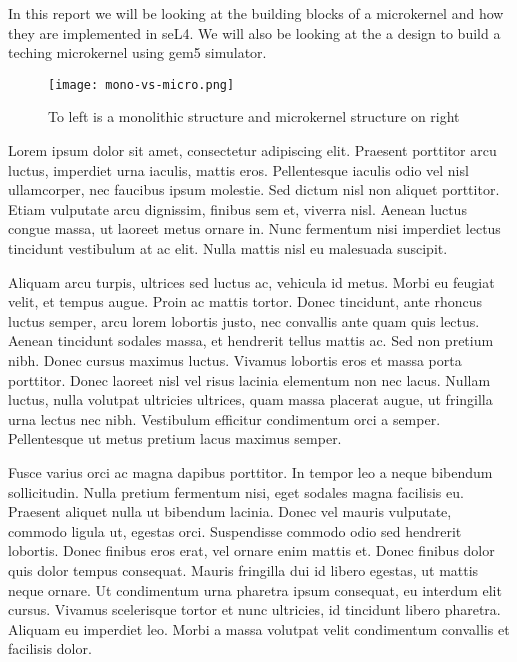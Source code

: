 \documentclass[
	a4paper, %
	10pt, %
	unnumberedsections, %
	twoside, %
]{LTJournalArticle}
\begin{document}
In this report we will be looking at the building blocks of a microkernel and how they are implemented in seL4. We will also be looking at the a design to build a teching microkernel using gem5 simulator.\cite{gem5}


\begin{figure*} %
	\texttt{[image: mono-vs-micro.png]}
	\caption{To left is a monolithic structure and microkernel structure on right~\cite{Heiser:2020}}
	\label{fig:microsemantic}
\end{figure*}

\newpage

Lorem ipsum dolor sit amet, consectetur adipiscing elit. Praesent porttitor arcu luctus, imperdiet urna iaculis, mattis eros. Pellentesque iaculis odio vel nisl ullamcorper, nec faucibus ipsum molestie. Sed dictum nisl non aliquet porttitor. Etiam vulputate arcu dignissim, finibus sem et, viverra nisl. Aenean luctus congue massa, ut laoreet metus ornare in. Nunc fermentum nisi imperdiet lectus tincidunt vestibulum at ac elit. Nulla mattis nisl eu malesuada suscipit.

Aliquam arcu turpis, ultrices sed luctus ac, vehicula id metus. Morbi eu feugiat velit, et tempus augue. Proin ac mattis tortor. Donec tincidunt, ante rhoncus luctus semper, arcu lorem lobortis justo, nec convallis ante quam quis lectus. Aenean tincidunt sodales massa, et hendrerit tellus mattis ac. Sed non pretium nibh. Donec cursus maximus luctus. Vivamus lobortis eros et massa porta porttitor. Donec laoreet nisl vel risus lacinia elementum non nec lacus. Nullam luctus, nulla volutpat ultricies ultrices, quam massa placerat augue, ut fringilla urna lectus nec nibh. Vestibulum efficitur condimentum orci a semper. Pellentesque ut metus pretium lacus maximus semper.

Fusce varius orci ac magna dapibus porttitor. In tempor leo a neque bibendum sollicitudin. Nulla pretium fermentum nisi, eget sodales magna facilisis eu. Praesent aliquet nulla ut bibendum lacinia. Donec vel mauris vulputate, commodo ligula ut, egestas orci. Suspendisse commodo odio sed hendrerit lobortis. Donec finibus eros erat, vel ornare enim mattis et. Donec finibus dolor quis dolor tempus consequat. Mauris fringilla dui id libero egestas, ut mattis neque ornare. Ut condimentum urna pharetra ipsum consequat, eu interdum elit cursus. Vivamus scelerisque tortor et nunc ultricies, id tincidunt libero pharetra. Aliquam eu imperdiet leo. Morbi a massa volutpat velit condimentum convallis et facilisis dolor.
\end{document}
